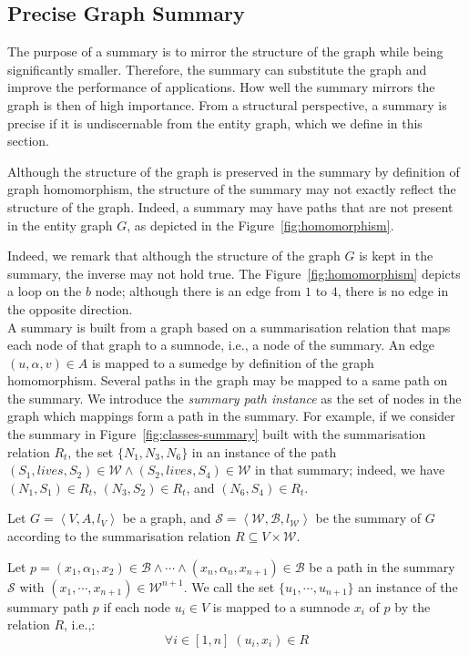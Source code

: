 \subsection{Precise Graph Summary}
\label{sec:precise-summary}

The purpose of a summary is to mirror the structure of the graph while being significantly smaller. Therefore, the summary can substitute the graph and improve the performance of applications. How well the summary mirrors the graph is then of high importance. From a structural perspective, a summary is precise if it is undiscernable from the entity graph, which we define in this section.

Although the structure of the graph is preserved in the summary by definition of graph homomorphism, the structure of the summary may not exactly reflect the structure of the graph. Indeed, a summary may have paths that are not present in the entity graph $G$, as depicted in the Figure~\ref{fig:homomorphism}.

Indeed, we remark that although the structure of the graph $G$ is kept in the summary, the inverse may not hold true. The Figure~\ref{fig:homomorphism} depicts a loop on the $b$ node; although there is an edge from $1$ to $4$, there is no edge in the opposite direction.\\

A summary is built from a graph based on a summarisation relation that maps each node of that graph to a sumnode, i.e., a node of the summary. An edge $(u, \alpha, v) \in A$ is mapped to a sumedge by definition of the graph homomorphism. Several paths in the graph may be mapped to a same path on the summary. We introduce the \emph{summary path instance} as the set of nodes in the graph which mappings form a path in the summary. For example, if we consider the summary in Figure~\ref{fig:classes-summary} built with the summarisation relation $R_t$, the set $\{N_1, N_3, N_6\}$ in an instance of the path $(S_1, lives, S_2) \in \mathcal{W} \wedge (S_2, lives, S_4) \in \mathcal{W}$ in that summary; indeed, we have $(N_1, S_1) \in R_t$, $(N_3, S_2) \in R_t$, and $(N_6, S_4) \in R_t$.

\begin{definition}
\label{def:summary-path-instance}
Let $G=\left\langle V, A, l_V \right\rangle$ be a graph, and $\mathcal{S} = \left\langle \mathcal{W}, \mathcal{B}, l_{\mathcal{W}} \right\rangle$ be the summary of $G$ according to the summarisation relation $R \subseteq V \times \mathcal{W}$.

Let $p = (x_1, \alpha_1, x_2) \in \mathcal{B} \wedge \cdots \wedge (x_n, \alpha_n, x_{n+1}) \in \mathcal{B}$ be a path in the summary $\mathcal{S}$ with $(x_1, \cdots, x_{n+1}) \in \mathcal{W}^{n+1}$.
We call the set $\{ u_1, \cdots, u_{n+1} \}$ an instance of the summary path $p$ if each node $u_i \in V$ is mapped to a sumnode $x_i$ of $p$ by the relation $R$, i.e.,:
$$
\forall i \in \left[1, n\right] \; (u_i, x_i) \in R
$$
\end{definition}

